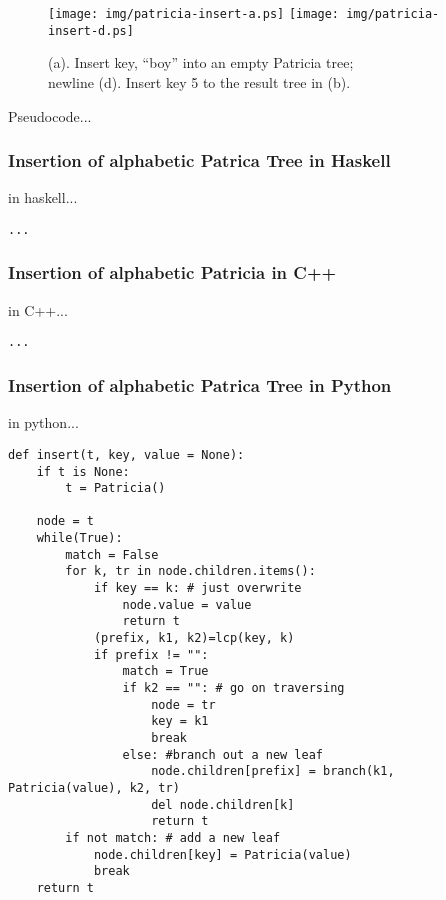 \documentclass{article}
\begin{document}
\begin{figure}[htbp]
       \begin{center}
	\texttt{[image: img/patricia-insert-a.ps]}
	\texttt{[image: img/patricia-insert-d.ps]}
        \caption{(a). Insert key, ``boy'' into an empty Patricia tree; \\newline
	(d). Insert key 5 to the result tree in (b).}
        \label{fig:int-patricia-insert-c}
       \end{center}
\end{figure}

Pseudocode...

\subsubsection*{Insertion of alphabetic Patrica Tree in Haskell}
in haskell...

\lstset{language=Haskell}
\begin{lstlisting}
...
\end{lstlisting}

\subsubsection*{Insertion of alphabetic Patricia in C++}
in C++...

\lstset{language=C++}
\begin{lstlisting}
...
\end{lstlisting}


\subsubsection*{Insertion of alphabetic Patrica Tree in Python}
in python...

\lstset{language=Python}
\begin{lstlisting}
def insert(t, key, value = None):
    if t is None:
        t = Patricia()

    node = t
    while(True):
        match = False
        for k, tr in node.children.items():
            if key == k: # just overwrite
                node.value = value
                return t
            (prefix, k1, k2)=lcp(key, k)
            if prefix != "":
                match = True
                if k2 == "": # go on traversing
                    node = tr
                    key = k1
                    break
                else: #branch out a new leaf
                    node.children[prefix] = branch(k1, Patricia(value), k2, tr)
                    del node.children[k]
                    return t
        if not match: # add a new leaf
            node.children[key] = Patricia(value)
            break
    return t
\end{lstlisting}
\end{document}
